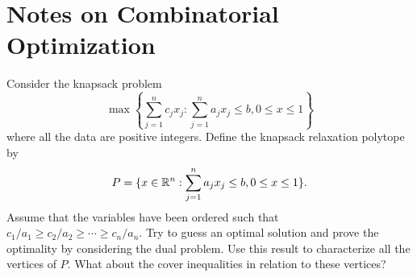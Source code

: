 \section{Notes on Combinatorial Optimization}

\begin{exercise}
  Consider the knapsack problem
  \begin{equation}
    \max \left\{
      \sum_{j = 1}^{n} c_j x_j :
      \sum_{j = 1}^{n} a_j x_j \leq b,
      0 \leq x \leq 1
    \right\}
  \end{equation}
  where all the data are positive integers.
  Define the knapsack relaxation polytope by
  \begin{equation}
    P = \{
      x \in \mathbb{R}^n :
      \sum_{j = 1}^{n} a_j x_j \leq b,
      0 \leq x \leq 1
    \}.
  \end{equation}
  Assume that the variables have been ordered such that $c_1 / a_1 \geq c_2 / a_2 \geq \cdots \geq c_n / a_n$.
  Try to guess an optimal solution and prove the optimality by considering the dual problem.
  Use this result to characterize all the vertices of $P$.
  What about the cover inequalities in relation to these vertices?
\end{exercise}

\begin{solution}

\end{solution}